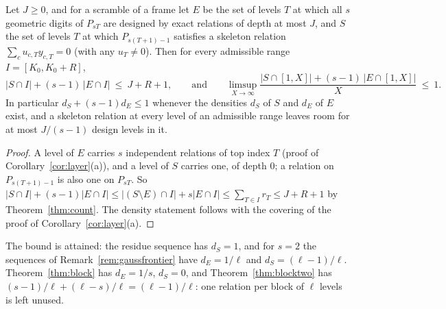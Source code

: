 \begin{corollary}\label{cor:density}
Let $J\ge0$, and for a scramble of a frame let $E$ be the set of levels $T$ at which all $s$ geometric digits of $P_{sT}$ are designed by exact relations of depth at most $J$, and $S$ the set of levels $T$ at which $P_{s(T+1)-1}$ satisfies a skeleton relation $\sum_cu_{c,T}y_{c,T}=0$ (with any $u_T\ne0$). Then for every admissible range $I=[K_0,K_0+R]$,
\[
|S\cap I|+(s-1)\,|E\cap I|\ \le\ J+R+1,
\qquad\text{and}\qquad
\limsup_{X\to\infty}\frac{|S\cap[1,X]|+(s-1)\,|E\cap[1,X]|}X\ \le\ 1 .
\]
In particular $d_S+(s-1)d_E\le1$ whenever the densities $d_S$ of $S$ and $d_E$ of $E$ exist, and a skeleton relation at every level of an admissible range leaves room for at most $J/(s-1)$ design levels in it.
\end{corollary}

\begin{proof}
A level of $E$ carries $s$ independent relations of top index $T$ (proof of Corollary~\ref{cor:layer}(a)), and a level of $S$ carries one, of depth $0$; a relation on $P_{s(T+1)-1}$ is also one on $P_{sT}$. So $|S\cap I|+(s-1)|E\cap I|\le|(S\setminus E)\cap I|+s|E\cap I|\le\sum_{T\in I}r_T\le J+R+1$ by Theorem~\ref{thm:count}. The density statement follows with the covering of the proof of Corollary~\ref{cor:layer}(a).
\end{proof}

The bound is attained: the residue sequence has $d_S=1$, and for $s=2$ the sequences of Remark~\ref{rem:gaussfrontier} have $d_E=1/\ell$ and $d_S=(\ell-1)/\ell$. Theorem~\ref{thm:block} has $d_E=1/s$, $d_S=0$, and Theorem~\ref{thm:blocktwo} has $(s-1)/\ell+(\ell-s)/\ell=(\ell-1)/\ell$: one relation per block of $\ell$ levels is left unused.

